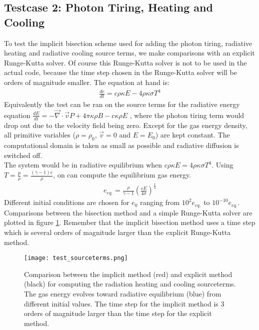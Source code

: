 \subsection{Testcase 2: Photon Tiring, Heating and Cooling}
To test the implicit bisection scheme used for adding the photon tiring, radiative heating and radiative cooling source terms, we make comparisons with an explicit Runge-Kutta solver. Of course this Runge-Kutta solver is not to be used in the actual code, because the time step chosen in the Runge-Kutta solver will be orders of magnitude smaller. The equation at hand is:
\begin{align}
\frac{d e}{dt} = c \rho \kappa E - 4 \rho \kappa \sigma T^4
\end{align}
Equivalently the test can be ran on the source terms for the radiative energy equation $\frac{dE}{dt} = - \vec{\nabla} \cdot \vec{v} P + 4\pi \kappa\rho B - c \kappa \rho E$ , where the photon tiring term would drop out due to the velocity field being zero.
Except for the gas energy density, all primitive variables ($\rho = \rho_0$, $\vec{v} = 0$ and $E = E_0$) are kept constant. The computational domain is taken as small as possible and radiative diffusion is switched off. \\

The system would be in radiative equilibrium when $c \rho \kappa E = 4 \rho \kappa \sigma T^4$. Using $T =  \frac{p}{\rho}= \frac{(\gamma - 1)e}{\rho}$, on can compute the equilibrium gas energy.
\begin{align}
e_{eq.} = \frac{\rho}{\gamma - 1} \left( \frac{c E}{4 \sigma} \right)^\frac{1}{4}
\end{align}
Different initial conditions are chosen for $e_0$ ranging from $10^2 e_{eq.}$ to $10^{-10} e_{eq.}$. Comparisons between the bisection method and a simple Runge-Kutta solver are plotted in figure \ref{fig: test_sourceterms}. Remember that the implicit bisection method uses a time step which is several orders of magnitude larger than the explicit Runge-Kutta method.

\begin{figure}
\texttt{[image: test\_sourceterms.png]}
\label{fig: test_sourceterms}
\caption{Comparison between the implicit method (red) and explicit method (black) for computing the radiation heating and cooling sourceterms. The gas energy evolves toward radiative equilibrium (blue) from different initial values. The time step for the implicit method is 3 orders of magnitude larger than the time step for the explicit method.}
\end{figure}

